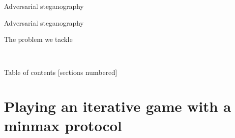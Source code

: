 \documentclass[10pt,aspectratio=169]{beamer}
\begin{document}
\begin{frame}{Adversarial steganography}
\end{frame}


\begin{frame}{Adversarial steganography}
\end{frame}


\begin{frame}{The problem we tackle}


     \\


    
\end{frame}





    


\begin{frame}{Table of contents}
    [sections numbered]
    \tableofcontents[hideallsubsections]
\end{frame}



\section{Playing an iterative game with a \textbf{minmax} protocol}
\end{document}

